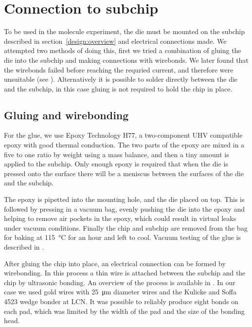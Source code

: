 \section{Connection to subchip}

To be used in the molecule experiment, the die must be mounted on the subchip
described in section~\ref{design:overview} and electrical connections made. We
attempted two methods of doing this, first we tried a combination of gluing the
die into the subchip and making connections with wirebonds. We later found that
the wirebonds failed before reaching the requried current, and therefore were
unsuitable (see ). Alternatively it is possible to solder directly between
the die and the subchip, in this case gluing is not required to hold the chip
in place.

\subsection{Gluing and wirebonding}
\label{fab:gluebond}

For the glue, we use Epoxy Technology H77, a two-component UHV compatible epoxy
with good thermal conduction.  The two parts of the epoxy are mixed in a five
to one ratio by weight using a mass balance, and then a tiny amount is applied
to the subchip. Only enough epoxy is required that when the die is pressed onto
the surface there will be a meniscus between the surfaces of the die and the
subchip.

The epoxy is pipetted into the mounting hole, and the die placed on top. This
is followed by pressing in a vacuum bag, evenly pushing the die into the epoxy
and helping to remove air pockets in the epoxy, which could result in
virtual leaks under vacuum conditions.
%
Finally the chip and subchip are removed from the bag for baking at
\SI{115}{\celsius} for an hour and left to cool. Vacuum testing of the glue is
described in .

After gluing the chip into place, an electrical connection can be formed by
wirebonding. In this process a thin wire is attached between the subchip and
the chip by ultrasonic bonding. An overview of the process is available in
. In our case we used gold wires with
\SI{25}{\micro\meter} diameter wires and the Kulicke and Soffa 4523 wedge
bonder at LCN. It was possible to reliably produce eight bonds on each pad,
which was limited by the width of the pad and the size of the bonding head.

